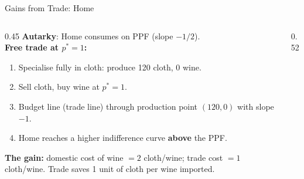 \documentclass[aspectratio=169]{beamer}
\begin{document}
\begin{frame}{Gains from Trade: Home}
\begin{columns}[T]
\begin{column}{0.45\textwidth}
\textbf{Autarky}: Home consumes on PPF
(slope $-1/2$).\\[0.4em]
\textbf{Free trade at $p^{*}=1$:}
\begin{enumerate}\small
  \item Specialise fully in cloth: produce 120 cloth,
        0 wine.
  \item Sell cloth, buy wine at $p^{*}=1$.
  \item Budget line (trade line) through production
        point $(120,0)$ with slope $-1$.
  \item Home reaches a higher indifference curve
        \textbf{above} the PPF.
\end{enumerate}
\vspace{0.2em}
\textbf{The gain:} domestic cost of wine $= 2$
cloth/wine; trade cost $= 1$ cloth/wine.
Trade saves 1 unit of cloth per wine imported.
\end{column}
\begin{column}{0.52\textwidth}
\end{column}
\end{columns}
\end{frame}
\end{document}
